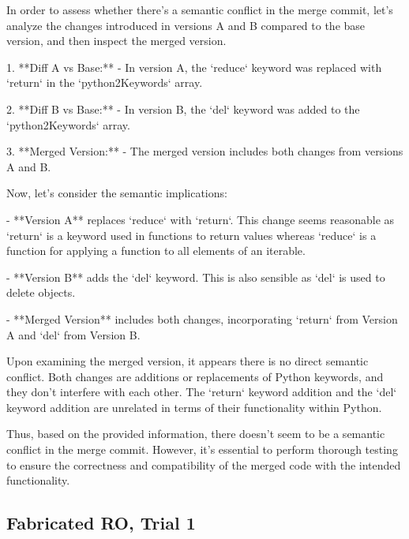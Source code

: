 \begin{answer}
  In order to assess whether there's a semantic conflict in the merge commit, let's analyze the changes introduced in versions A and B compared to the base version, and then inspect the merged version.

  1. **Diff A vs Base:**
     - In version A, the `reduce` keyword was replaced with `return` in the `python2Keywords` array.
  
  2. **Diff B vs Base:**
     - In version B, the `del` keyword was added to the `python2Keywords` array.
  
  3. **Merged Version:**
     - The merged version includes both changes from versions A and B.
  
  Now, let's consider the semantic implications:
  
  - **Version A** replaces `reduce` with `return`. This change seems reasonable as `return` is a keyword used in functions to return values whereas `reduce` is a function for applying a function to all elements of an iterable.
    
  - **Version B** adds the `del` keyword. This is also sensible as `del` is used to delete objects.
  
  - **Merged Version** includes both changes, incorporating `return` from Version A and `del` from Version B.
  
  Upon examining the merged version, it appears there is no direct semantic conflict. Both changes are additions or replacements of Python keywords, and they don't interfere with each other. The `return` keyword addition and the `del` keyword addition are unrelated in terms of their functionality within Python.
  
  Thus, based on the provided information, there doesn't seem to be a semantic conflict in the merge commit. However, it's essential to perform thorough testing to ensure the correctness and compatibility of the merged code with the intended functionality.
\end{answer}

\subsection{Fabricated RO, Trial 1}

